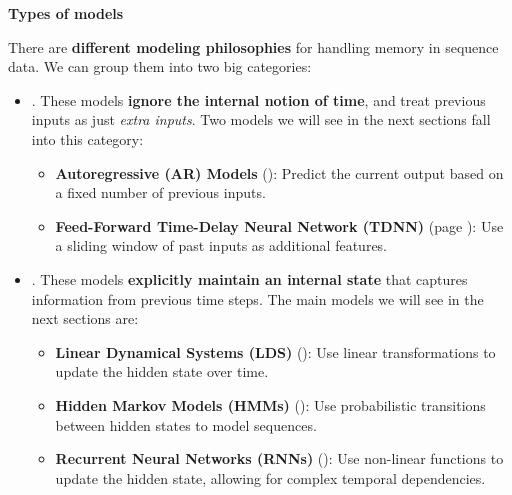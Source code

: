 \highspace
\begin{flushleft}
    \textcolor{Green3}{ \textbf{Types of models}}
\end{flushleft}
There are \textbf{different modeling philosophies} for handling memory in sequence data. We can group them into two big categories:
\begin{itemize}
    \item {}. These models \textbf{ignore the internal notion of time}, and treat previous inputs as just \emph{extra inputs}. Two models we will see in the next sections fall into this category:
    \begin{itemize}
        \item \textbf{Autoregressive (AR) Models} (): Predict the current output based on a fixed number of previous inputs.
        \item \textbf{Feed-Forward Time-Delay Neural Network (TDNN)} (page \pageref{sec:feed-forward-extensions-time-delay-neural-networks-tdnn}): Use a sliding window of past inputs as additional features.
    \end{itemize}
    
    \item {}. These models \textbf{explicitly maintain an internal state} that captures information from previous time steps. The main models we will see in the next sections are:
    \begin{itemize}
        \item \textbf{Linear Dynamical Systems (LDS)} (): Use linear transformations to update the hidden state over time.
        \item \textbf{Hidden Markov Models (HMMs)} (): Use probabilistic transitions between hidden states to model sequences.
        \item \textbf{Recurrent Neural Networks (RNNs)} (): Use non-linear functions to update the hidden state, allowing for complex temporal dependencies.
    \end{itemize}
\end{itemize}